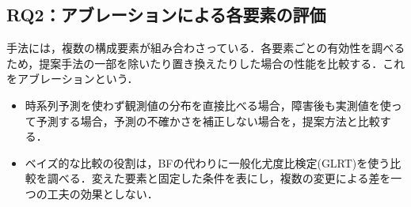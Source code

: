 \begin{table}[h]
  \centering
  \caption{各RCA手法の平均ランタイム（秒）}
  \label{tab:rca-runtime}

  \begingroup
  \setlength{\tabcolsep}{24pt}

  \endgroup
\end{table}

\subsection{RQ2：アブレーションによる各要素の評価}
手法には，複数の構成要素が組み合わさっている．各要素ごとの有効性を調べるため，提案手法の一部を除いたり置き換えたりした場合の性能を比較する．これをアブレーションという．
\begin{itemize}
    \item 時系列予測を使わず観測値の分布を直接比べる場合，障害後も実測値を使って予測する場合，予測の不確かさを補正しない場合を，提案方法と比較する．
    \item ベイズ的な比較の役割は，BFの代わりに一般化尤度比検定(GLRT)を使う比較を調べる．変えた要素と固定した条件を表にし，複数の変更による差を一つの工夫の効果としない．
\end{itemize}

